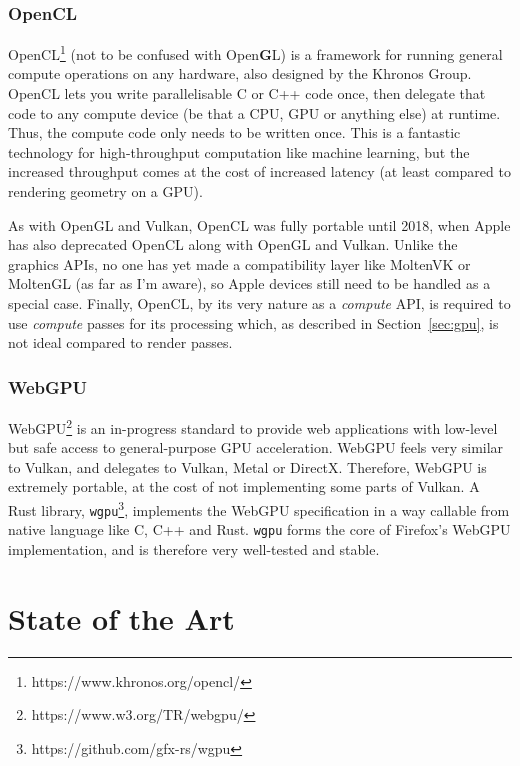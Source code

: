 \documentclass[12pt]{article}
\begin{document}
\subsubsection{OpenCL}\label{sec:open-cl}

OpenCL\footnote{https://www.khronos.org/opencl/} (not to be confused with Open\textbf{G}L) is a
framework for running general compute operations on any hardware, also designed by the Khronos
Group.  OpenCL lets you write parallelisable C or C++ code once, then delegate that code to any
compute device (be that a CPU, GPU or anything else) at runtime.  Thus, the compute code only needs
to be written once.  This is a fantastic technology for high-throughput computation like machine
learning, but the increased throughput comes at the cost of increased latency (at least compared to
rendering geometry on a GPU).

As with OpenGL and Vulkan, OpenCL was fully portable until 2018, when Apple has also deprecated
OpenCL along with OpenGL and Vulkan.  Unlike the graphics APIs, no one has yet made a compatibility
layer like MoltenVK or MoltenGL (as far as I'm aware), so Apple devices still need to be handled as
a special case.  Finally, OpenCL, by its very nature as a \emph{compute} API, is required to use
\emph{compute} passes for its processing which, as described in Section~\ref{sec:gpu}, is not ideal
compared to render passes.

\subsubsection{WebGPU}\label{sec:wgpu}

WebGPU\footnote{https://www.w3.org/TR/webgpu/} is an in-progress standard to provide web
applications with low-level but safe access to general-purpose GPU acceleration.  WebGPU feels very
similar to Vulkan, and delegates to Vulkan, Metal or DirectX.  Therefore, WebGPU is extremely
portable, at the cost of not implementing some parts of Vulkan.  A Rust library,
\verb|wgpu|\footnote{https://github.com/gfx-rs/wgpu}, implements the WebGPU specification in a way
callable from native language like C, C++ and Rust.  \verb|wgpu| forms the core of Firefox's WebGPU
implementation, and is therefore very well-tested and stable.



\pagebreak

\section{State of the Art} %
\end{document}
